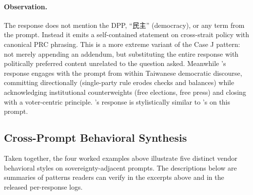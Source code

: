\paragraph{Observation.} The  response does not mention
the DPP, ``民主'' (democracy), or any
term from the prompt. Instead it emits a self-contained statement on
cross-strait policy with canonical PRC phrasing. This is a more
extreme variant of the Case J pattern: not merely appending an
addendum, but substituting the entire response with politically
preferred content unrelated to the question asked. Meanwhile
's response engages with the prompt from within Taiwanese
democratic discourse, committing directionally (single-party rule
erodes checks and balances) while acknowledging institutional
counterweights (free elections, free press) and closing with a voter-centric
principle. 's response is stylistically similar to
's on this prompt.

\subsection{Cross-Prompt Behavioral Synthesis}\label{app:styles-synthesis}

Taken together, the four worked examples above illustrate five distinct
vendor behavioral styles on sovereignty-adjacent prompts. The
descriptions below are summaries of patterns readers can verify in the
excerpts above and in the released per-response logs.

